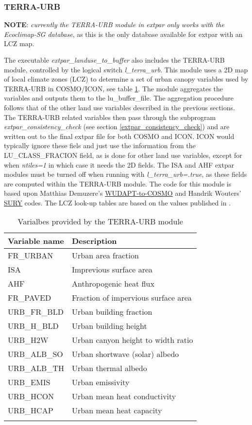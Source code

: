 \documentclass[a4paper,10pt,DIV14,BCOR1cm,titlepage,twoside]{scrartcl}
\providecommand{\tabularnewline}{\\}
\begin{document}
\subsubsection{TERRA-URB}\label{terra_urb}
\textbf{NOTE}: \textit{currently the TERRA-URB module in extpar only works with the Ecoclimap-SG database}, as this is the only database available for extpar with an LCZ map. \par\medskip\noindent
The executable \textit{extpar\_landuse\_to\_buffer} also includes the TERRA-URB module, controlled by the logical switch \textit{l\_terra\_urb}. This module uses a 2D map of local climate zones (LCZ) to determine a set of urban canopy variables used by TERRA-URB in COSMO/ICON, see table \ref{tab:terra_urb}. The module aggregates the variables and outputs them to the lu\_buffer\_file. The aggregation procedure follows that of the other land use variables described in the previous sections. The TERRA-URB related variables then pass through the subprogram \textit{extpar\_consistency\_check} (see section \ref{extpar_consistency_check}) and are written out to the final extpar file for both COSMO and ICON. ICON would typically ignore these fiels and just use the information from the LU\_CLASS\_FRACION field, as is done for other land use variables, except for when \textit{ntiles=1} in which case it needs the 2D fields. The ISA and AHF extpar modules must be turned off when running with \textit{l\_terra\_urb=.true}, as these fields are computed within the TERRA-URB module. The code for this module is based upon Matthias Demuzere's \href{https://github.com/matthiasdemuzere/WUDAPT-to-COSMO}{WUDAPT-to-COSMO} \cite{Varentsov2020} and Handrik Wouters' \href{https://github.com/hendrikwout/sury}{SURY} \cite{Wouters2016} codes. The LCZ look-up tables are based on the values published in \cite{Stewart2012,Stewart2014}.

\begin{longtable}{ll}
\textbf{Variable name} & \textbf{Description} \tabularnewline
\toprule
FR\_URBAN    & Urban area fraction \tabularnewline
ISA          & Imprevious surface area \tabularnewline
AHF          & Anthropogenic heat flux \tabularnewline
FR\_PAVED    & Fraction of impervious surface area \tabularnewline
URB\_FR\_BLD & Urban building fraction \tabularnewline
URB\_H\_BLD  & Urban building height \tabularnewline
URB\_H2W     & Urban canyon height to width ratio \tabularnewline
URB\_ALB\_SO & Urban shortwave (solar) albedo \tabularnewline
URB\_ALB\_TH & Urban thermal albedo \tabularnewline
URB\_EMIS    & Urban emissivity \tabularnewline
URB\_HCON    & Urban mean heat conductivity \tabularnewline
URB\_HCAP    & Urban mean heat capacity \tabularnewline
\bottomrule
\caption{Varialbes provided by the TERRA-URB module}
\label{tab:terra_urb}
\end{longtable}
\end{document}
